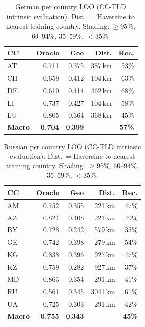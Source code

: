 \documentclass[11pt]{article}
\begin{document}
\begin{table}[t]
\centering
\small
\setlength{\tabcolsep}{4.5pt}
\begin{tabular}{lrrrr}
\toprule
\textbf{CC} & \textbf{Oracle} & \textbf{Geo} & \textbf{Dist.} & \textbf{Rec.}\\
\midrule
\rowcolor{mid}  AT & 0.711 & 0.375 &  387\,km & 53\% \\
\rowcolor{high} CH & 0.659 & 0.412 &  104\,km & 63\% \\
\rowcolor{high} DE & 0.610 & 0.414 &  462\,km & 68\% \\
\rowcolor{mid}  LI & 0.737 & 0.427 &  104\,km & 58\% \\
\rowcolor{mid}  LU & 0.805 & 0.364 &  368\,km & 45\% \\
\midrule
\textbf{Macro} & \textbf{0.704} & \textbf{0.399} & --- & \textbf{57\%}\\
\bottomrule
\end{tabular}
\caption{German per country LOO (CC-TLD intrinsic evaluation).
  Dist.\ = Haversine to nearest training country.
  Shading: \colorbox{best}{$\geq$95\%}, \colorbox{high}{60--94\%}, \colorbox{mid}{35--59\%}, \colorbox{low}{$<$35\%}.}
\label{tab:de}
\end{table}

\begin{table}[t]
\centering
\small
\setlength{\tabcolsep}{4.5pt}
\begin{tabular}{lrrrr}
\toprule
\textbf{CC} & \textbf{Oracle} & \textbf{Geo} & \textbf{Dist.} & \textbf{Rec.}\\
\midrule
\rowcolor{mid}  AM & 0.752 & 0.355 &  221\,km & 47\% \\
\rowcolor{mid}  AZ & 0.824 & 0.408 &  221\,km & 49\% \\
\rowcolor{low}  BY & 0.728 & 0.242 &  579\,km & 33\% \\
\rowcolor{mid}  GE & 0.742 & 0.398 &  279\,km & 54\% \\
\rowcolor{mid}  KG & 0.838 & 0.396 &  927\,km & 47\% \\
\rowcolor{mid}  KZ & 0.759 & 0.282 &  927\,km & 37\% \\
\rowcolor{mid}  MD & 0.863 & 0.354 &  291\,km & 41\% \\
\rowcolor{high} RU & 0.561 & 0.345 & 3041\,km & 61\% \\
\rowcolor{mid}  UA & 0.725 & 0.303 &  291\,km & 42\% \\
\midrule
\textbf{Macro} & \textbf{0.755} & \textbf{0.343} & --- & \textbf{45\%}\\
\bottomrule
\end{tabular}
\caption{Russian per country LOO (CC-TLD intrinsic evaluation).
  Dist.\ = Haversine to nearest training country.
  Shading: \colorbox{best}{$\geq$95\%}, \colorbox{high}{60--94\%}, \colorbox{mid}{35--59\%}, \colorbox{low}{$<$35\%}.}
\label{tab:ru}
\end{table}
\end{document}
